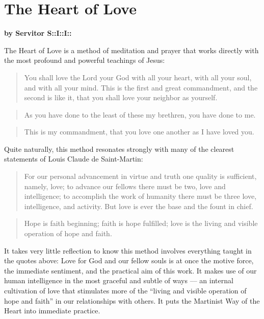 \documentclass{article}
\begin{document}
\section*{The Heart of Love}
{\large\textbf{by Servitor S::I::I::}}

The Heart of Love is a method of meditation and prayer that works directly with the most
profound and powerful teachings of Jesus: 

\begin{quote}
	You shall love the Lord your God with all your heart, with all your soul, and with
	all your mind. This is the first and great commandment, and the second is like it,
	that you shall love your neighbor as yourself.
\end{quote}
\begin{quote}
	As you have done to the least of these my brethren, you have done to me.
\end{quote}
\begin{quote}
	This is my commandment, that you love one another as I have loved you.
\end{quote}

Quite naturally, this method resonates strongly with many of the clearest statements of
Louis Claude de Saint-Martin:

\begin{quote}
For our personal advancement in virtue and truth one quality is sufficient,
namely, love; to advance our fellows there must be two, love and intelligence; to
accomplish the work of humanity there must be three love, intelligence, and
activity. But love is ever the base and the fount in chief.
\end{quote}
\begin{quote}
Hope is faith beginning; faith is hope fulfilled; love is the living and visible
operation of hope and faith.
\end{quote}

It takes very little reflection to know this method involves everything taught in the quotes
above: Love for God and our fellow souls is at once the motive force, the immediate
sentiment, and the practical aim of this work. It makes use of our human intelligence in
the most graceful and subtle of ways --– an internal cultivation of love that stimulates more
of the ``living and visible operation of hope and faith'' in our relationships with others. It
puts the Martinist Way of the Heart into immediate practice.
\end{document}
